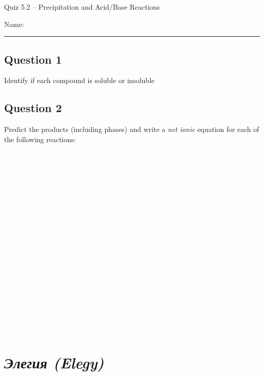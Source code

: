 \documentclass[11pt, letterpaper]{memoir}
\begin{document}
	\begin{center}
		{\large Quiz 5.2 --	Precipitation and Acid/Base Reactions}
	\end{center}
	{\large Name: \rule[-1mm]{4in}{.1pt} 

\subsection*{Question 1}
Identify if each compound is soluble or insoluble

{\large {} \hspace{5em} \hspace{5em} \hspace{5em} }

\vspace{3em} {\large {}\hspace{5em} \hspace{5em} \hspace{5em} }

\vspace{3em}
\subsection*{Question 2}
Predict the products (including phases) and write a \emph{net ionic} equation for each of the following reactions:

~


~

~


~

~


~

~


~

~


~

~

\newpage
{}
\pagestyle{empty}
\addtocounter{page}{-1}
\section*{\emph{Элегия (Elegy)}}
}
\end{document}
